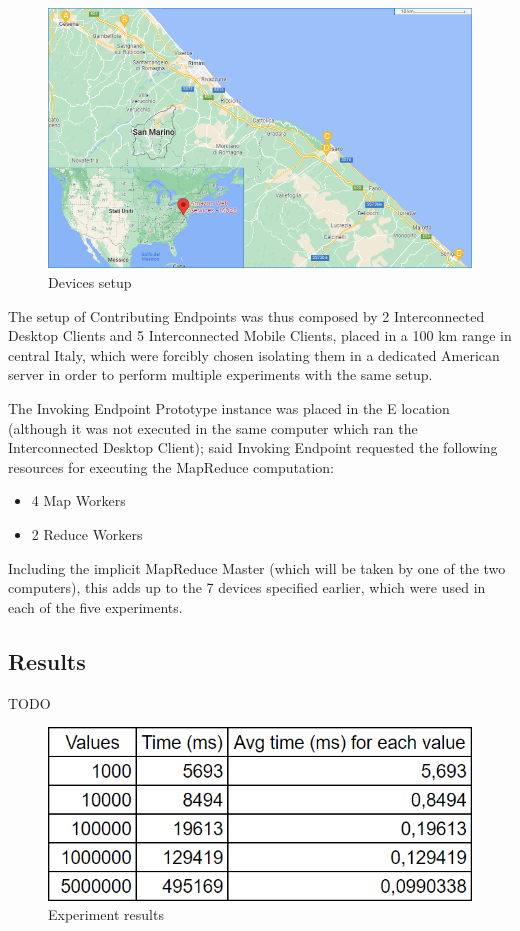 \begin{figure}[!ht]
    \centering
    \includegraphics[width=\linewidth]{document/chapters/chapter_7/images/experiment_devices_setup.png}
    \caption{Devices setup}
    \label{fig:experiment_devices_setup}
\end{figure}

The setup of Contributing Endpoints was thus composed by 2 Interconnected Desktop Clients and 5 Interconnected Mobile Clients, placed in a 100 km range in central Italy, which were forcibly chosen isolating them in a dedicated American server in order to perform multiple experiments with the same setup.

The Invoking Endpoint Prototype instance was placed in the E location (although it was not executed in the same computer which ran the Interconnected Desktop Client); said Invoking Endpoint requested the following resources for executing the MapReduce computation:
\begin{itemize}
    \item 4 Map Workers
    \item 2 Reduce Workers
\end{itemize}
Including the implicit MapReduce Master (which will be taken by one of the two computers), this adds up to the 7 devices specified earlier, which were used in each of the five experiments.

\subsection{Results}
TODO

\begin{figure}[!ht]
    \centering
    \includegraphics[scale=0.55]{document/chapters/chapter_7/images/experiment_results.png}
    \caption{Experiment results}
    \label{fig:experiment_results}
\end{figure}

